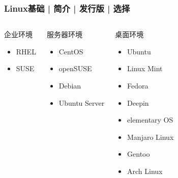 \begin{frame}
  \frametitle{Linux基础 | 简介 | 发行版 | 选择}
  \begin{columns}
  \begin{block}{企业环境}
    \begin{itemize}
      \item RHEL
      \item SUSE
    \end{itemize}
  \end{block}
  \pause
  \begin{block}{服务器环境}
    \begin{itemize}
      \item CentOS
      \item openSUSE
      \item Debian
      \item Ubuntu Server
    \end{itemize}
  \end{block}
  \pause
  \begin{block}{桌面环境}
    \begin{itemize}
      \item Ubuntu
      \item Linux Mint
      \item Fedora
      \item Deepin
      \item elementary OS
      \item Manjaro Linux
      \item Gentoo
      \item Arch Linux
    \end{itemize}
  \end{block}
\end{columns}
\end{frame}

